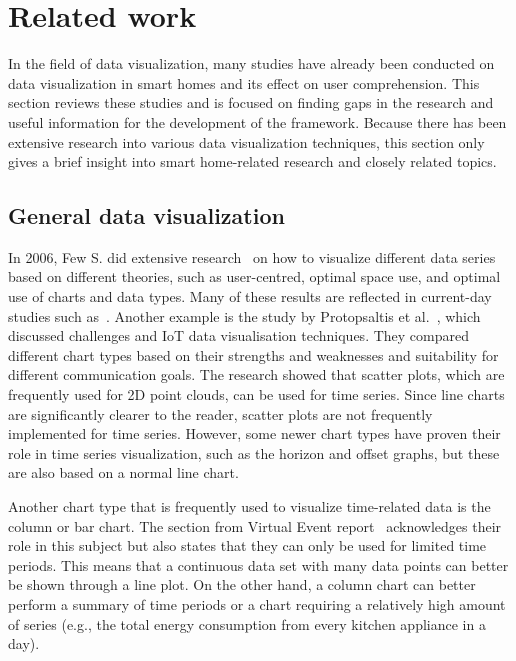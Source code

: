 \documentclass[journal]{IEEEtran}
\begin{document}
\section{Related work} %

In the field of data visualization, many studies have already been conducted on data visualization in smart homes and its effect on user comprehension. This section reviews these studies and is focused on finding gaps in the research and useful information for the development of the framework. Because there has been extensive research into various data visualization techniques, this section only gives a brief insight into smart home-related research and closely related topics. 

\subsection{General data visualization}
In 2006, Few S. did extensive research~\cite{StephenFew2006InformationDesign} on how to visualize different data series based on different theories, such as user-centred, optimal space use, and optimal use of charts and data types. Many of these results are reflected in current-day studies such as~\cite{Heer2009SizingVisualizations, CastelliWhatVisualization}. Another example is the study by Protopsaltis et al.~\cite{Protopsaltis2020DataChallenges}, which discussed challenges and IoT data visualisation techniques. They compared different chart types based on their strengths and weaknesses and suitability for different communication goals. The research showed that scatter plots, which are frequently used for 2D point clouds, can be used for time series. Since line charts are significantly clearer to the reader, scatter plots are not frequently implemented for time series. However, some newer chart types have proven their role in time series visualization, such as the horizon and offset graphs, but these are also based on a normal line chart. 

Another chart type that is frequently used to visualize time-related data is the column or bar chart. The section from Virtual Event report~\cite{Protopsaltis2020DataChallenges} acknowledges their role in this subject but also states that they can only be used for limited time periods. This means that a continuous data set with many data points can better be shown through a line plot. On the other hand, a column chart can better perform a summary of time periods or a chart requiring a relatively high amount of series (e.g., the total energy consumption from every kitchen appliance in a day).
\end{document}
